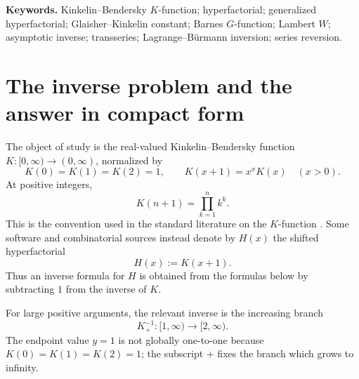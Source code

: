 \documentclass[11pt,oneside]{article}
\theoremstyle{plain}
\theoremstyle{definition}
\theoremstyle{remark}
\begin{document}
\noindent\textbf{Keywords.}
Kinkelin--Bendersky \(K\)-function; hyperfactorial; generalized hyperfactorial;
Glaisher--Kinkelin constant; Barnes \(G\)-function; Lambert \(W\); asymptotic
inverse; transseries; Lagrange--B\"urmann inversion; series reversion.

\begingroup
\footnotesize
\let\originaladdvspace\addvspace
\renewcommand{\addvspace}[1]{\originaladdvspace{0.25em}}
\tableofcontents
\endgroup
\clearpage

\section{The inverse problem and the answer in compact form}
\label{sec:intro}

The object of study is the real-valued Kinkelin--Bendersky function
\(K:[0,\infty)\to(0,\infty)\), normalized by
\begin{equation}
 K(0)=K(1)=K(2)=1,
 \qquad K(x+1)=x^xK(x)\quad(x>0).
 \label{eq:K-functional}
\end{equation}
At positive integers,
\begin{equation}
 K(n+1)=\prod_{k=1}^{n}k^k.
 \label{eq:K-integers}
\end{equation}
This is the convention used in the standard literature on the \(K\)-function
\cite{Bendersky1933,SondowHadjicostas2007}.  Some software and combinatorial
sources instead denote by \(H(x)\) the shifted hyperfactorial
\begin{equation}
 H(x):=K(x+1).
 \label{eq:H-shift}
\end{equation}
Thus an inverse formula for \(H\) is obtained from the formulas below by
subtracting \(1\) from the inverse of \(K\).

For large positive arguments, the relevant inverse is the increasing branch
\begin{equation}
 K_+^{-1}:[1,\infty)\longrightarrow[2,\infty).
 \label{eq:real-inverse-branch}
\end{equation}
The endpoint value \(y=1\) is not globally one-to-one because
\(K(0)=K(1)=K(2)=1\); the subscript \(+\) fixes the branch which grows to
infinity.
\end{document}
